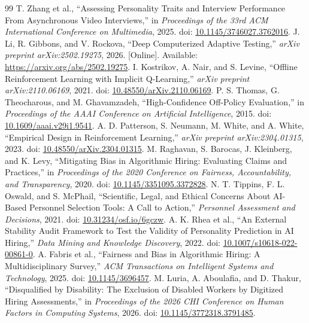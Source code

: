 \documentclass[journal]{IEEEtran}
\begin{document}
\begin{thebibliography}{99}
 T. Zhang et al., ``Assessing Personality Traits and Interview Performance From Asynchronous Video Interviews,'' in \emph{Proceedings of the 33rd ACM International Conference on Multimedia}, 2025. doi: \href{https://doi.org/10.1145/3746027.3762016}{10.1145/3746027.3762016}.
 J. Li, R. Gibbons, and V. Rockova, ``Deep Computerized Adaptive Testing,'' \emph{arXiv preprint arXiv:2502.19275}, 2026. [Online]. Available: \url{https://arxiv.org/abs/2502.19275}.
 I. Kostrikov, A. Nair, and S. Levine, ``Offline Reinforcement Learning with Implicit Q-Learning,'' \emph{arXiv preprint arXiv:2110.06169}, 2021. doi: \href{https://doi.org/10.48550/arXiv.2110.06169}{10.48550/arXiv.2110.06169}.
 P. S. Thomas, G. Theocharous, and M. Ghavamzadeh, ``High-Confidence Off-Policy Evaluation,'' in \emph{Proceedings of the AAAI Conference on Artificial Intelligence}, 2015. doi: \href{https://doi.org/10.1609/aaai.v29i1.9541}{10.1609/aaai.v29i1.9541}.
 A. D. Patterson, S. Neumann, M. White, and A. White, ``Empirical Design in Reinforcement Learning,'' \emph{arXiv preprint arXiv:2304.01315}, 2023. doi: \href{https://doi.org/10.48550/arXiv.2304.01315}{10.48550/arXiv.2304.01315}.
 M. Raghavan, S. Barocas, J. Kleinberg, and K. Levy, ``Mitigating Bias in Algorithmic Hiring: Evaluating Claims and Practices,'' in \emph{Proceedings of the 2020 Conference on Fairness, Accountability, and Transparency}, 2020. doi: \href{https://doi.org/10.1145/3351095.3372828}{10.1145/3351095.3372828}.
 N. T. Tippins, F. L. Oswald, and S. McPhail, ``Scientific, Legal, and Ethical Concerns About AI-Based Personnel Selection Tools: A Call to Action,'' \emph{Personnel Assessment and Decisions}, 2021. doi: \href{https://doi.org/10.31234/osf.io/6gczw}{10.31234/osf.io/6gczw}.
 A. K. Rhea et al., ``An External Stability Audit Framework to Test the Validity of Personality Prediction in AI Hiring,'' \emph{Data Mining and Knowledge Discovery}, 2022. doi: \href{https://doi.org/10.1007/s10618-022-00861-0}{10.1007/s10618-022-00861-0}.
 A. Fabris et al., ``Fairness and Bias in Algorithmic Hiring: A Multidisciplinary Survey,'' \emph{ACM Transactions on Intelligent Systems and Technology}, 2025. doi: \href{https://doi.org/10.1145/3696457}{10.1145/3696457}.
 M. Luria, A. Aboulafia, and D. Thakur, ``Disqualified by Disability: The Exclusion of Disabled Workers by Digitized Hiring Assessments,'' in \emph{Proceedings of the 2026 CHI Conference on Human Factors in Computing Systems}, 2026. doi: \href{https://doi.org/10.1145/3772318.3791485}{10.1145/3772318.3791485}.

\end{thebibliography}
\end{document}
